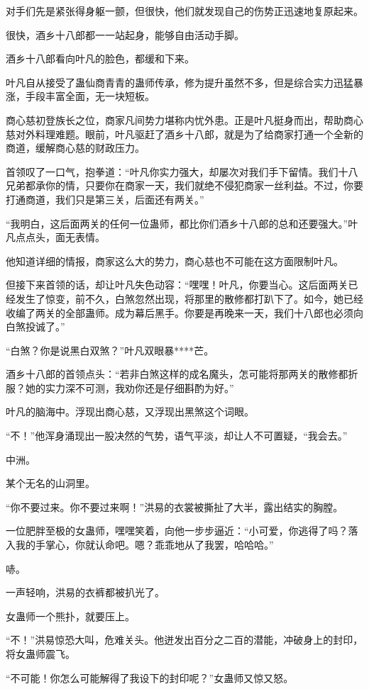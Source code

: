 \begin{this_body}
对手们先是紧张得身躯一颤，但很快，他们就发现自己的伤势正迅速地复原起来。

很快，酒乡十八郎都一一站起身，能够自由活动手脚。

酒乡十八郎看向叶凡的脸色，都缓和下来。

叶凡自从接受了蛊仙商青青的蛊师传承，修为提升虽然不多，但是综合实力迅猛暴涨，手段丰富全面，无一块短板。

商心慈初登族长之位，商家凡间势力堪称内忧外患。正是叶凡挺身而出，帮助商心慈对外料理难题。眼前，叶凡驱赶了酒乡十八郎，就是为了给商家打通一个全新的商道，缓解商心慈的财政压力。

首领叹了一口气，抱拳道：“叶凡你实力强大，却屡次对我们手下留情。我们十八兄弟都承你的情，只要你在商家一天，我们就绝不侵犯商家一丝利益。不过，你要打通商道，我们只是第三关，后面还有两关。”

“我明白，这后面两关的任何一位蛊师，都比你们酒乡十八郎的总和还要强大。”叶凡点点头，面无表情。

他知道详细的情报，商家这么大的势力，商心慈也不可能在这方面限制叶凡。

但接下来首领的话，却让叶凡失色动容：“嘿嘿！叶凡，你要当心。这后面两关已经发生了惊变，前不久，白煞忽然出现，将那里的散修都打趴下了。如今，她已经收编了两关的全部蛊师。成为幕后黑手。你要是再晚来一天，我们十八郎也必须向白煞投诚了。”

“白煞？你是说黑白双煞？”叶凡双眼暴****芒。

酒乡十八郎的首领点头：“若非白煞这样的成名魔头，怎可能将那两关的散修都折服？她的实力深不可测，我劝你还是仔细斟酌为好。”

叶凡的脑海中。浮现出商心慈，又浮现出黑煞这个词眼。

“不！”他浑身涌现出一股决然的气势，语气平淡，却让人不可置疑，“我会去。”

中洲。

某个无名的山洞里。

“你不要过来。你不要过来啊！”洪易的衣裳被撕扯了大半，露出结实的胸膛。

一位肥胖至极的女蛊师，嘿嘿笑着，向他一步步逼近：“小可爱，你逃得了吗？落入我的手掌心，你就认命吧。嗯？乖乖地从了我罢，哈哈哈。”

哧。

一声轻响，洪易的衣裤都被扒光了。

女蛊师一个熊扑，就要压上。

“不！”洪易惊恐大叫，危难关头。他迸发出百分之二百的潜能，冲破身上的封印，将女蛊师震飞。

“不可能！你怎么可能解得了我设下的封印呢？”女蛊师又惊又怒。


\end{this_body}
